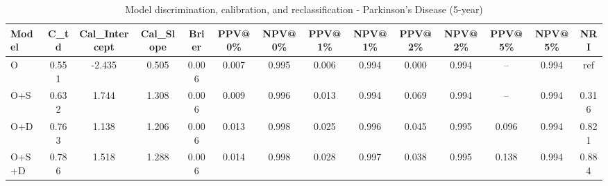 \begin{table}[htbp]
\centering
\small
\caption{Model discrimination, calibration, and reclassification - Parkinson's Disease (5-year)}
\label{tab:perf_pd_5y}
\begin{tabular}{lccccccccccccc}
\toprule
Model & C\_td & Cal\_Intercept & Cal\_Slope & Brier & PPV@0\% & NPV@0\% & PPV@1\% & NPV@1\% & PPV@2\% & NPV@2\% & PPV@5\% & NPV@5\% & NRI \\
\midrule
O & 0.551 & -2.435 & 0.505 & 0.006 & 0.007 & 0.995 & 0.006 & 0.994 & 0.000 & 0.994 & -- & 0.994 & ref \\
O+S & 0.632 & 1.744 & 1.308 & 0.006 & 0.009 & 0.996 & 0.013 & 0.994 & 0.069 & 0.994 & -- & 0.994 & 0.316 \\
O+D & 0.763 & 1.138 & 1.206 & 0.006 & 0.013 & 0.998 & 0.025 & 0.996 & 0.045 & 0.995 & 0.096 & 0.994 & 0.821 \\
O+S+D & 0.786 & 1.518 & 1.288 & 0.006 & 0.014 & 0.998 & 0.028 & 0.997 & 0.038 & 0.995 & 0.138 & 0.994 & 0.884 \\
\bottomrule
\end{tabular}
\end{table}